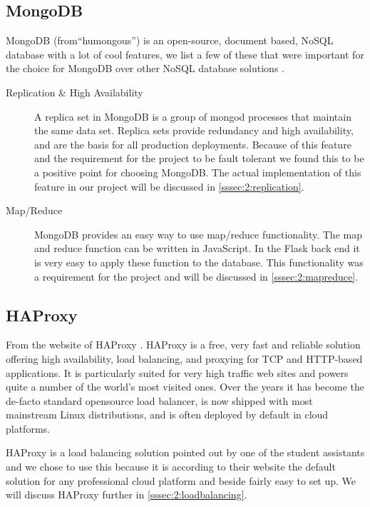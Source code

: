 \subsection{MongoDB}
\label{ssec:2:mongodb}
MongoDB (from``humongous'') is an open-source, document based, NoSQL database with a lot of cool features, we list a few of these that were important for the choice for MongoDB over other NoSQL database solutions \cite{mongo-db}.

\begin{description}
\item[Replication \& High Availability] A replica set in MongoDB is a group of mongod processes that maintain the same data set. Replica sets provide redundancy and high availability, and are the basis for all production deployments. Because of this feature and the requirement for the project to be fault tolerant we found this to be a positive point for choosing MongoDB. The actual implementation of this feature in our project will be discussed in \autoref{sssec:2:replication}.

\item[Map/Reduce] MongoDB provides an easy way to use map/reduce functionality. The map and reduce function can be written in JavaScript. In the Flask back end it is very easy to apply these function to the database. This functionality was a requirement for the project and will be discussed in \autoref{sssec:2:mapreduce}.
\end{description}

\subsection{HAProxy}
\label{ssec:2:haproxy}
From the website of HAProxy \cite{ha-proxy}. HAProxy is a free, very fast and reliable solution offering high availability, load balancing, and proxying for TCP and HTTP-based applications. It is particularly suited for very high traffic web sites and powers quite a number of the world's most visited ones. Over the years it has become the de-facto standard opensource load balancer, is now shipped with most mainstream Linux distributions, and is often deployed by default in cloud platforms.

HAProxy is a load balancing solution pointed out by one of the student assistants and we chose to use this because it is according to their website the default solution for any professional cloud platform and beside fairly easy to set up. We will discuss HAProxy further in \autoref{sssec:2:loadbalancing}.

